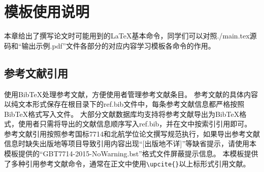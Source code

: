 \chapter{模板使用说明}

本章给出了撰写论文时可能用到的\LaTeX 基本命令，同学们可以对照./main.tex源码和“输出示例.pdf”文件各部分的对应内容学习模板各命令的作用。

\section{参考文献引用}

\BUAAThesis{} 使用BibTeX处理参考文献，方便使用者管理参考文献条目。
参考文献的具体内容以纯文本形式保存在根目录下的ref.bib文件中，每条参考文献信息都严格按照BibTeX格式写入文件。
大部分文献数据库均支持将参考文献导出为BibTeX格式，使用者只需将导出的文献信息顺序写入ref.bib，并在文中按索引引用即可。
参考文献引用按照参考国标7714和北航学位论文撰写规范执行，如果导出参考文献信息时缺失出版地等项目导致引用内容出现“[出版地不详]”等缺省提示，请使用本模板提供的“GBT7714-2015-NoWarning.bst”格式文件屏蔽提示信息。
本模板提供了多种引用参考文献命令，通常在正文中使用\verb|\upcite{}|以上标形式引用文献。


